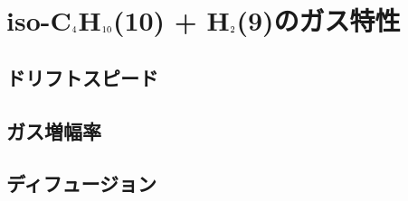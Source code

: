 \chapter{iso-C$_{\text 4}$H$_{\text 10}$(10) + H$_{\text 2}$(9)のガス特性}

\section{ドリフトスピード}
\section{ガス増幅率}
\section{ディフュージョン}

